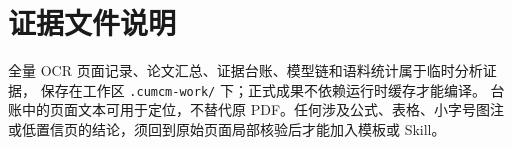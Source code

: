 \section{证据文件说明}

全量 OCR 页面记录、论文汇总、证据台账、模型链和语料统计属于临时分析证据，
保存在工作区 \texttt{.cumcm-work/} 下；正式成果不依赖运行时缓存才能编译。
台账中的页面文本可用于定位，不替代原 PDF。任何涉及公式、表格、小字号图注
或低置信页的结论，须回到原始页面局部核验后才能加入模板或 Skill。


